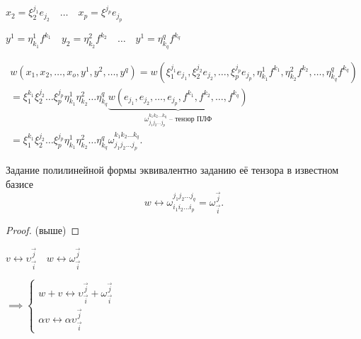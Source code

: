 \documentclass{book}
\theoremstyle{definition}
\begin{document}
    $x_2 = \xi_2^{j_1}e_{j_2}\quad \ldots \quad x_p = \xi^{j_p}e_{j_p}$

    $y^1 = \eta_{k_1}^1f^{k_1}\quad y_2 = \eta_{k_2}^2f^{k_2}\quad \ldots \quad y^1 = \eta_{k_q}^qf^{k_q}$ 

    \begin{align*}
        
    w\left( x_1, x_2, \ldots, x_o, y^1, y^2, \ldots, y^q \right) = w\left( \xi_1^{j_1}e_{j_1}, \xi_2^{j_2}e_{j_2}, \ldots, \xi_p^{j_p}e_{j_p}, \eta_{k_1}^1f^{k_1}, \eta^2_{k_2}f^{k_2}, \ldots, \eta_{k_q}^qf^{k_q} \right) \\
    = \xi_1^{k_1}\xi_2^{j_2}\ldots\xi_p^{j_p}\eta_{k_1}^1\eta_{k_2}^2\ldots\eta_{k_q}^q \underbrace{w\left( e_{j_1}, e_{j_2}, \ldots, e_{j_p}, f^{k_1}, f^{k_2}, \ldots, f^{k_q} \right) }\limits_{\omega_{j_1j_2 \ldots j_p}^{k_1 k_2 \ldots k_q} \text{ -- тензор ПЛФ}}
    \\ = \xi_1^{k_1}\xi_2^{j_2}\ldots\xi_p^{j_p}\eta_{k_1}^1\eta_{k_2}^2\ldots\eta_{k_q}^q \omega_{j_1 j_2 \ldots j_p} ^{k_1 k_2 ... k_q}
    .\end{align*}

    \begin{lemma}
        Задание полилинейной формы эквивалентно заданию её тензора в известном базисе
        \[
            w \longleftrightarrow \omega_{i_1 i_2 \ldots i_p} ^{j_1 j_2 \ldots j_q} = \omega^{\vec j}_{\vec i}
        .\] 
    \end{lemma}
    \begin{proof}
        (выше)
    \end{proof}

    \begin{lemma}
        $v \longleftrightarrow \upsilon_{\vec i}^{\vec j}\quad w \longleftrightarrow \omega_{\vec i}^{\vec j}$

        $\implies \begin{cases}
            w+v \longleftrightarrow \upsilon_{\vec i}^{\vec j} + \omega_{\vec i}^{\vec j}\\
            \alpha v \longleftrightarrow \alpha \upsilon_{\vec i}^{\vec j}
        \end{cases}$
    \end{lemma}
\end{document}
